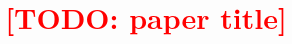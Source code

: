 \documentclass[letterpaper,twocolumn,10pt]{article}
\newcommand{\TODO}[1]{\textcolor{red}{[TODO: #1]}}
\begin{document}

\date{}

\title{\Large \bf \TODO{paper title}}

\author{}

\maketitle

















\balance

\end{document}

